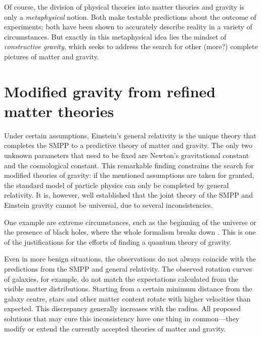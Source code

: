 Of course, the division of physical theories into matter theories and gravity is only a \emph{metaphysical} notion. Both make testable predictions about the outcome of experiments; both have been shown to accurately describe reality in a variety of circumstances. But exactly in this metaphysical idea lies the mindset of \emph{constructive gravity}, which seeks to address the search for other (more?) complete pictures of matter and gravity.

\section{Modified gravity from refined matter theories}
Under certain assumptions, Einstein's general relativity is the unique theory that completes the SMPP to a predictive theory of matter and gravity. \cite{Lovelock_1969,Hojman_1976,Deser_1970} The only two unknown parameters that need to be fixed are Newton's gravitational constant and the cosmological constant. This remarkable finding constrains the search for modified theories of gravity: if the mentioned assumptions are taken for granted, the standard model of particle physics can only be completed by general relativity. It is, however, well established that the joint theory of the SMPP and Einstein gravity cannot be universal, due to several inconsistencies.

One example are extreme circumstances, such as the beginning of the universe or the presence of black holes, where the whole formalism breaks down \cite{}. This is one of the justifications for the efforts of finding a quantum theory of gravity.

Even in more benign situations, the observations do not always coincide with the predictions from the SMPP and general relativity. The observed rotation curves of galaxies, for example, do not match the expectations calculated from the visible matter distributions. Starting from a certain minimum distance from the galaxy centre, stars and other matter content rotate with higher velocities than expected. \cite{Freeman_1970,Rubin_1970,Rubin_1980} This discrepancy generally increases with the radius. All proposed solutions \cite{} that may cure this inconsistency have one thing in common---they modify or extend the currently accepted theories of matter and gravity.

